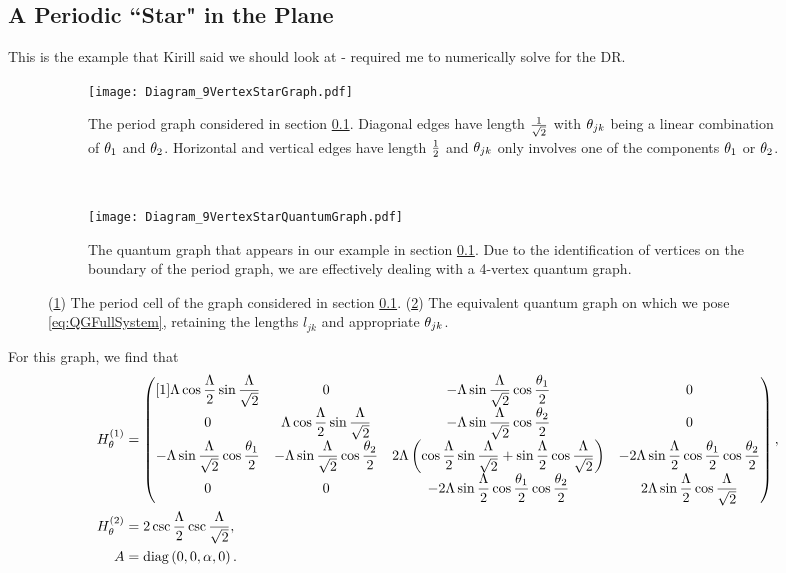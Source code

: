 \subsection{A Periodic ``Star" in the Plane} \label{ssec:9VertexStarGraph}
This is the example that Kirill said we should look at - required me to numerically solve for the DR.
\begin{figure}[t]
	\centering
	\begin{subfigure}[t]{0.45\textwidth}
		\centering
		\texttt{[image: Diagram\_9VertexStarGraph.pdf]}
		\caption{\label{fig:Diagram_9VertexStarGraph} The period graph considered in section \ref{ssec:9VertexStarGraph}. Diagonal edges have length $\frac{1}{\sqrt{2}}$ with $\theta_{jk}$ being a linear combination of $\theta_1$ and $\theta_2$. Horizontal and vertical edges have length $\frac{1}{2}$ and $\theta_{jk}$ only involves one of the components $\theta_1$ or $\theta_2$.}
	\end{subfigure}
	~
	\begin{subfigure}[t]{0.45\textwidth}
		\centering
		\texttt{[image: Diagram\_9VertexStarQuantumGraph.pdf]}
		\caption{\label{fig:Diagram_9VertexStarQuantumGraph} The quantum graph that appears in our example in section \ref{ssec:9VertexStarGraph}. Due to the identification of vertices on the boundary of the period graph, we are effectively dealing with a 4-vertex quantum graph.}
	\end{subfigure}
	\caption{\label{fig:9VertexStarGraph} (\ref{fig:Diagram_9VertexStarGraph}) The period cell of the graph considered in section \ref{ssec:9VertexStarGraph}. (\ref{fig:Diagram_9VertexStarQuantumGraph}) The equivalent quantum graph on which we pose \eqref{eq:QGFullSystem}, retaining the lengths $l_{jk}$ and appropriate $\theta_{jk}$.}
\end{figure}
For this graph, we find that
\begin{align*}
	H_{\theta}^{(1)} &=
	\begin{pmatrix}[1]
		\Lambda\cos\dfrac{\Lambda}{2}\sin\dfrac{\Lambda}{\sqrt{2}} &
		0 &
		-\Lambda\sin\dfrac{\Lambda}{\sqrt{2}}\cos\dfrac{\theta_1}{2} &
		0 \\
		0 &
		\Lambda\cos\dfrac{\Lambda}{2}\sin\dfrac{\Lambda}{\sqrt{2}} &
		-\Lambda\sin\dfrac{\Lambda}{\sqrt{2}}\cos\dfrac{\theta_2}{2} &
		0 \\
		-\Lambda\sin\dfrac{\Lambda}{\sqrt{2}}\cos\dfrac{\theta_1}{2} &
		-\Lambda\sin\dfrac{\Lambda}{\sqrt{2}}\cos\dfrac{\theta_2}{2} &
		2\Lambda\left(  \cos\dfrac{\Lambda}{2}\sin\dfrac{\Lambda}{\sqrt{2}} + \sin\dfrac{\Lambda}{2}\cos\dfrac{\Lambda}{\sqrt{2}}  \right) &
		-2\Lambda\sin\dfrac{\Lambda}{2}\cos\dfrac{\theta_1}{2}\cos\dfrac{\theta_2}{2} \\
		0 &
		0 &
		-2\Lambda\sin\dfrac{\Lambda}{2}\cos\dfrac{\theta_1}{2}\cos\dfrac{\theta_2}{2} &
		2\Lambda\sin\dfrac{\Lambda}{2}\cos\dfrac{\Lambda}{\sqrt{2}}
	\end{pmatrix}, \\
	H_{\theta}^{(2)} &= 2\csc\dfrac{\Lambda}{2}\csc\dfrac{\Lambda}{\sqrt{2}}, \\
	A &= \mathrm{diag}\left( 0,0,\alpha,0 \right).
\end{align*}
